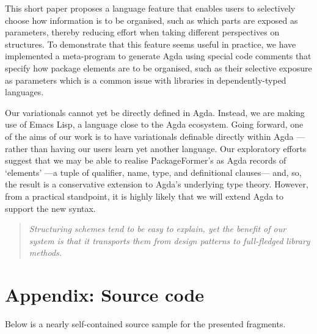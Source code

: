 \documentclass[sigplan,screen]{acmart}
\begin{document}
This short paper proposes a language feature that enables users to selectively
choose how information is to be organised, such as which parts are exposed as parameters,
thereby reducing effort when taking different perspectives on structures.
To demonstrate that this feature seems useful in practice,
we have implemented a meta-program to generate Agda using special code comments
that specify how package elements are to be organised, such as their selective exposure
as parameters which is a common issue with libraries in dependently-typed languages.

Our variationals
cannot yet be directly defined in Agda. Instead, we are making use of Emacs Lisp, a language
close to the Agda ecosystem. Going forward, one of the aims of our work is to have variationals
definable directly within Agda ---rather than having our users learn yet another language.
Our exploratory efforts suggest that we may be able to realise PackageFormer's as Agda records
of ‘elements’ ---a tuple of qualifier, name, type, and definitional clauses---
and, so, the result is a conservative extension to Agda's underlying type theory.
However, from a practical standpoint, it is highly likely that we will extend Agda to support
the new syntax.

\begin{quote}
\emph{Structuring schemes tend to be easy to explain, yet the benefit of our}
\emph{system is that it transports them from design patterns to full-fledged}
\emph{library methods.}
\end{quote}




\section{Appendix: Source code}
\label{sec:org9ef54f2}

Below is a nearly self-contained source sample for the presented fragments.
\end{document}
